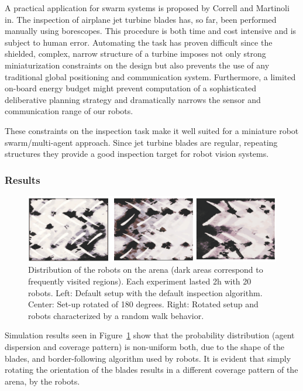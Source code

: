 \documentclass[Main.tex]{subfiles}
\begin{document}
A practical application for swarm systems is proposed by Correll and Martinoli in\cite{Correll2006,Correll2007}. The inspection of airplane jet turbine blades has, so far, been performed manually using borescopes. This procedure is both time and cost intensive and is subject to human error. Automating the task has proven difficult since the shielded, complex, narrow structure of a turbine imposes not only strong miniaturization constraints on the design but also prevents the use of any traditional global positioning and communication system. Furthermore, a limited on-board energy budget might prevent computation of a sophisticated deliberative planning strategy and dramatically narrows the sensor and communication range of our robots.~\cite{Correll2006}

These constraints on the inspection task make it well suited for a miniature robot swarm/multi-agent approach. Since jet turbine blades are regular, repeating structures they provide a good inspection target for robot vision systems.

\subsubsection*{Results}
\begin{figure}[!htb]
\centering\includegraphics[width=.75\textwidth]{assets/bladeDist.png}
\caption{Distribution of the robots on the arena (dark areas correspond to frequently visited regions). Each experiment lasted 2h with 20 robots. Left: Default setup with the default inspection algorithm. Center: Set-up rotated of 180 degrees. Right: Rotated setup and robots characterized by a random walk behavior.}\label{fig:bladedist}
\end{figure}

Simulation results seen in Figure~\ref{fig:bladedist} show that the probability distribution (agent dispersion and coverage pattern) is non-uniform both, due to the shape of the blades, and border-following algorithm used by robots. It is evident that simply rotating the orientation of the blades results in a different coverage pattern of the arena, by the robots.
\end{document}
